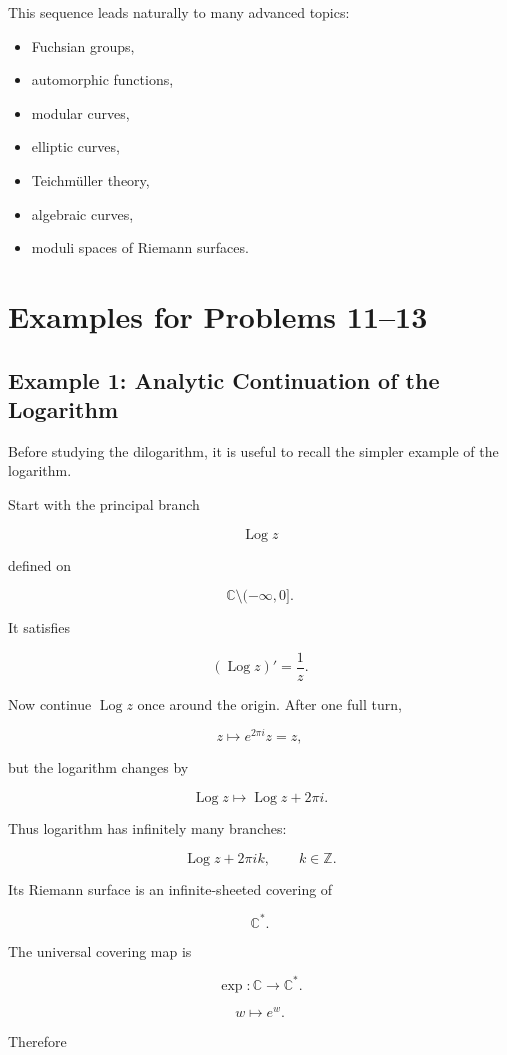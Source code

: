 \documentclass[12pt,a4paper]{article}
\theoremstyle{notespace}
\DeclareMathOperator{\Log}{Log}
\begin{document}
This sequence leads naturally to many advanced topics:

\begin{itemize}
	\item Fuchsian groups,
	\item automorphic functions,
	\item modular curves,
	\item elliptic curves,
	\item Teichmüller theory,
	\item algebraic curves,
	\item moduli spaces of Riemann surfaces.
\end{itemize}
\section{Examples for Problems 11--13}

\subsection{Example 1: Analytic Continuation of the Logarithm}

Before studying the dilogarithm, it is useful to recall the simpler example of the logarithm.

Start with the principal branch

\[
\Log z
\]

defined on

\[
\mathbb C\setminus (-\infty,0].
\]

It satisfies

\[
(\Log z)'=\frac1z.
\]

Now continue \(\Log z\) once around the origin. After one full turn,

\[
z\mapsto e^{2\pi i}z=z,
\]

but the logarithm changes by

\[
\Log z \mapsto \Log z+2\pi i.
\]

Thus logarithm has infinitely many branches:

\[
\Log z+2\pi i k,
\qquad k\in\mathbb Z.
\]

Its Riemann surface is an infinite-sheeted covering of

\[
\mathbb C^*.
\]

The universal covering map is

\[
\exp:\mathbb C\to\mathbb C^*.
\]

\[
w\mapsto e^w.
\]

Therefore
\end{document}
